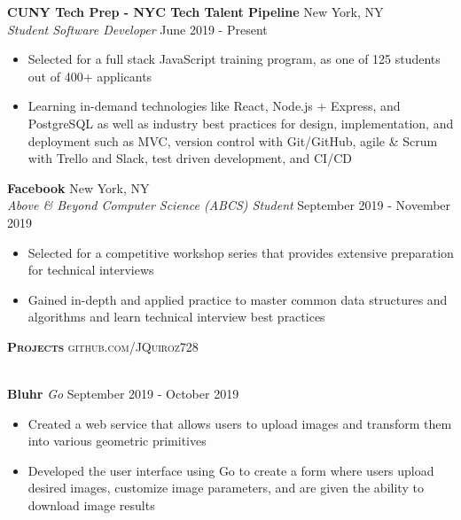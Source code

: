 \documentclass[a4paper]{article}
\newcommand{\lineunder} {
    \vspace*{-8pt} \\
    \hspace*{-18pt} \hrulefill \\
}
\newcommand{\header} [1] {
    {\hspace*{-18pt}\vspace*{6pt} \textsc{#1}}
    \vspace*{-6pt} \lineunder
}
\begin{document}
\textbf{CUNY Tech Prep - NYC Tech Talent Pipeline} \hfill New York, NY\\
\textit{Student Software Developer} \hfill June 2019 - Present\\
\vspace{-3mm}
\begin{itemize} \itemsep -2pt
	\item Selected for a full stack JavaScript training program, as one of 125 students out of 400+ applicants
	\item Learning in-demand technologies like React, Node.js + Express, and PostgreSQL as well as industry best practices for design, implementation, and deployment such as MVC, version control with Git/GitHub, agile \& Scrum with Trello and Slack, test driven development, and CI/CD
\end{itemize}
\textbf{Facebook} \hfill New York, NY\\
\textit{Above \& Beyond Computer Science (ABCS) Student} \hfill September 2019 - November 2019\\
\vspace{-3mm}
\begin{itemize} \itemsep -2pt
	\item Selected for a competitive workshop series that provides extensive preparation for technical interviews
	\item Gained in-depth and applied practice to master common data structures and algorithms and learn technical interview best practices
\end{itemize}

\header{\textbf{Projects} \hfill github.com/JQuiroz728} 
\vspace{1mm}

{\textbf{Bluhr}} {\sl Go} \hfill September 2019 - October 2019\\
\vspace{-3mm}
\begin{itemize} \itemsep -2pt
	\item Created a web service that allows users to upload images and transform them into various geometric primitives
    \item Developed the user interface using Go to create a form where users upload desired images, customize image parameters, and are given the ability to download image results
    
    \end{itemize}
    
\end{document}
